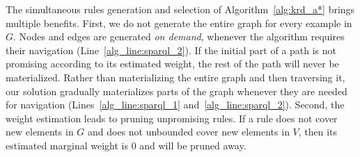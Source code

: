 The simultaneous rules generation and selection of Algorithm~\ref{alg:krd_a*} brings multiple benefits. First, we do not generate the entire graph for every example in $G$. Nodes and edges are generated \emph{on demand}, whenever the algorithm requires their navigation (Line~\ref{alg_line:sparql_2}). If the initial part of a path is not promising according to its estimated weight, the rest of the path will never be materialized. %
Rather than materializing the entire graph and then traversing it, our solution gradually materializes parts of the graph whenever they are needed for navigation (Lines~\ref{alg_line:sparql_1} and~\ref{alg_line:sparql_2}). 
Second, the weight estimation leads to pruning unpromising rules. If a rule does not cover new elements in $G$ and does not unbounded cover new elements in $V$, then its estimated marginal weight is $0$ and will be pruned away. 






